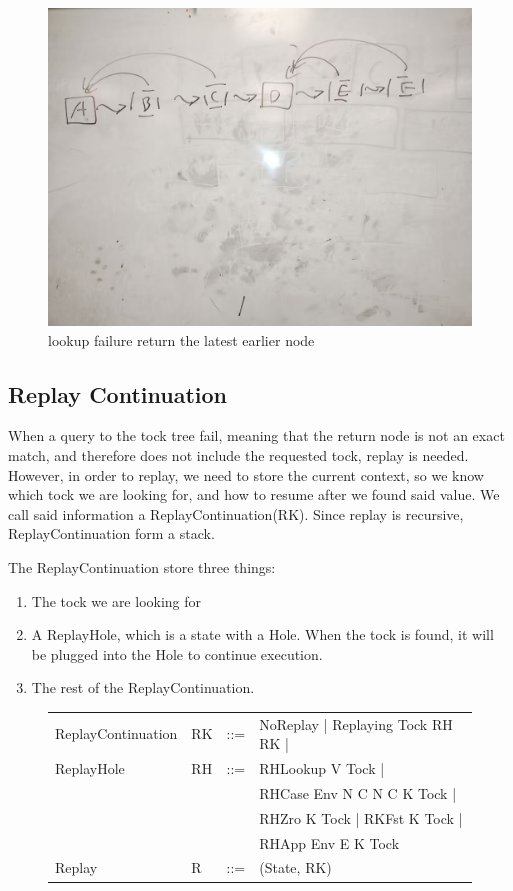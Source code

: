 \begin{figure}
    \includegraphics[width=0.5\columnwidth]{img4}
    \caption{lookup failure return the latest earlier node}
\end{figure}

\subsection{Replay Continuation}
When a query to the tock tree fail, meaning that the return node is not an exact match, and therefore does not include the requested tock, replay is needed. However, in order to replay, we need to store the current context, so we know which tock we are looking for, and how to resume after we found said value. We call said information a ReplayContinuation(RK). Since replay is recursive, ReplayContinuation form a stack.

The ReplayContinuation store three things:
\begin{enumerate}
	\item The tock we are looking for
	\item A ReplayHole, which is a state with a Hole. When the tock is found, it will be plugged into the Hole to continue execution.
	\item The rest of the ReplayContinuation.
\end{enumerate}

\begin{figure}
    \begin{tabular}{p{10em} p{2.6em} p{1em} p{}}
        ReplayContinuation & RK & ::= & NoReplay | Replaying Tock RH RK | \\
        ReplayHole & RH & ::= & RHLookup V Tock | \\
        & & & RHCase Env N C N C K Tock | \\
        & & & RHZro K Tock | RKFst K Tock | \\
        & & & RHApp Env E K Tock \\
        Replay & R & ::= & (State, RK) \\
    \end{tabular}
\end{figure}

